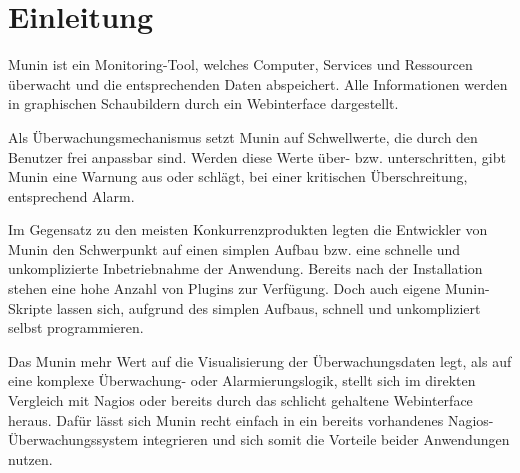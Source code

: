 \section{Einleitung}

Munin ist ein Monitoring-Tool, welches Computer, Services und Ressourcen überwacht und die entsprechenden Daten abspeichert. Alle Informationen werden in graphischen Schaubildern durch ein Webinterface dargestellt.

Als Überwachungsmechanismus setzt Munin auf Schwellwerte, die durch den Benutzer frei anpassbar sind.
Werden diese Werte über- bzw. unterschritten, gibt Munin eine Warnung aus oder schlägt, bei einer kritischen Überschreitung, entsprechend Alarm.

Im Gegensatz zu den meisten Konkurrenzprodukten legten die Entwickler von Munin den Schwerpunkt auf einen simplen Aufbau bzw. eine schnelle und unkomplizierte Inbetriebnahme der Anwendung.
Bereits nach der Installation stehen eine hohe Anzahl von Plugins zur Verfügung.
Doch auch eigene Munin-Skripte lassen sich, aufgrund des simplen Aufbaus, schnell und unkompliziert selbst programmieren.

Das Munin mehr Wert auf die Visualisierung der Überwachungsdaten legt, als auf eine komplexe Überwachung- oder Alarmierungslogik, stellt sich im direkten Vergleich mit Nagios oder bereits durch das schlicht gehaltene Webinterface heraus.
Dafür lässt sich Munin recht einfach in ein bereits vorhandenes Nagios-Überwachungssystem integrieren und sich somit die Vorteile beider Anwendungen nutzen.
